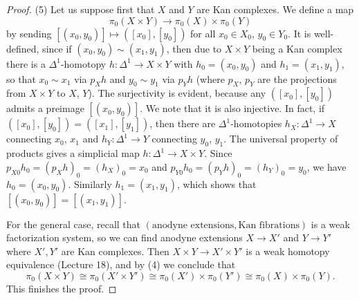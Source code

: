 \documentclass[a4paper,11pt,openany]{scrartcl}
\begin{document}
\begin{proof}
(5) Let us suppose first that $X$ and $Y$ are Kan complexes. We define a map 
\[
\pi_0(X\times Y)\to\pi_0(X)\times\pi_0(Y)
\]
by sending $[(x_0,y_0)]\mapsto([x_0],[y_0])$ for all $x_0\in X_0$, $y_0\in Y_0$. It is well-defined, since if $(x_0,y_0)\sim(x_1,y_1)$, then due to $X\times Y$ being a Kan complex there is a $\Delta^1$-homotopy $h\colon\Delta^1\to X\times Y$ with $h_0=(x_0,y_0)$ and $h_1=(x_1,y_1)$, so that $x_0\sim x_1$ via $p_Xh$ and $y_0\sim y_1$ via $p_Yh$ (where $p_X$, $p_Y$ are the projections from $X\times Y$ to $X$, $Y$). The surjectivity is evident, because any $([x_0],[y_0])$ admits a preimage $[(x_0,y_0)]$. We note that it is also injective. In fact, if $([x_0],[y_0])=([x_1],[y_1])$, then there are $\Delta^1$-homotopies $h_X\colon\Delta^1\to X$ connecting $x_0$, $x_1$ and $h_Y\colon\Delta^1\to Y$ connecting $y_0$, $y_1$. The universal property of products gives a simplicial map $h\colon\Delta^1\to X\times Y$. Since $p_{X0}h_0=(p_Xh)_0=(h_X)_0=x_0$ and $p_{Y0}h_0=(p_Yh)_0=(h_Y)_0=y_0$, we have $h_0=(x_0,y_0)$. Similarly $h_1=(x_1,y_1)$, which shows that $[(x_0,y_0)]=[(x_1,y_1)]$.

For the general case, recall that $(\text{anodyne extensions},\text{Kan fibrations})$ is a weak factorization system, so we can find anodyne extensions $X\to X'$ and $Y\to Y'$ where $X',Y'$ are Kan complexes. Then $X\times Y\to X'\times Y'$ is a weak homotopy equivalence (Lecture 18), and by (4) we conclude that
\[
\pi_0(X\times Y)\cong\pi_0(X'\times Y')\cong\pi_0(X')\times\pi_0(Y')\cong\pi_0(X)\times\pi_0(Y).
\]
This finishes the proof.
\end{proof}
\end{document}

